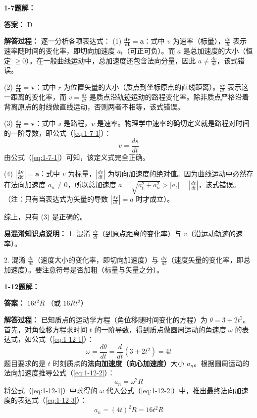\textbf{1-7题解：}
\setcounter{equation}{0}
\renewcommand{\theHequation}{1-7.\arabic{equation}}

\textbf{答案：} D

\textbf{解答过程：}
逐一分析各项表达式：
(1) $\mathbf{\frac{dv}{dt} = a}$：式中 $v$ 为速率（标量），$\frac{dv}{dt}$ 表示速率随时间的变化率，即切向加速度 $a_t$（可正可负）。而 $a$ 是总加速度的大小（恒定 $\ge 0$）。在一般曲线运动中，总加速度还包含法向分量，因此 $a \neq \frac{dv}{dt}$，该式错误。

(2) $\mathbf{\frac{dr}{dt} = v}$：式中 $r$ 为位置矢量的大小（质点到坐标原点的直线距离）。$\frac{dr}{dt}$ 表示这一距离的变化率，而 $v = \frac{ds}{dt}$ 是质点沿轨迹运动的路程变化率。除非质点严格沿着背离原点的射线做直线运动，否则两者不相等，该式错误。

(3) $\mathbf{\frac{ds}{dt} = v}$：式中 $s$ 是路程，$v$ 是速率。物理学中速率的确切定义就是路程对时间的一阶导数，即公式（\ref{eq:1-7-1}）：
\begin{equation}\label{eq:1-7-1}
	v = \frac{ds}{dt}
\end{equation}
由公式（\ref{eq:1-7-1}）可知，该定义式完全正确。

(4) $\mathbf{\left| \frac{dv}{dt} \right| = a}$：式中 $v$ 为标量，$\left| \frac{dv}{dt} \right|$ 为切向加速度的绝对值。因为曲线运动中必然存在法向加速度 $a_n \neq 0$，所以总加速度 $a = \sqrt{a_t^2 + a_n^2} > |a_t| = \left| \frac{dv}{dt} \right|$，该式错误。（注：只有当表达式为矢量的导数 $\left| \frac{d\mathbf{v}}{dt} \right| = a$ 时才成立）。

综上，只有 (3) 是正确的。

\textbf{易混淆知识点说明：}
1. 混淆 $\frac{dr}{dt}$（到原点距离的变化率）与 $v$（沿运动轨迹的速率）。

2. 混淆 $\frac{dv}{dt}$（速度大小的变化率，即切向加速度）与 $\frac{d\mathbf{v}}{dt}$（速度矢量的变化率，即总加速度）。要注意符号是否加粗（标量与矢量之分）。

\vspace{2em}

\textbf{1-12题解：}
\setcounter{equation}{0}
\renewcommand{\theHequation}{1-12.\arabic{equation}}

\textbf{答案：} $16t^2 R$ （或 $16Rt^2$）

\textbf{解答过程：}
已知质点的运动学方程（角位移随时间变化的方程）为 $\theta = 3 + 2t^2$。
首先，对角位移方程求时间 $t$ 的一阶导数，得到质点做圆周运动的角速度 $\omega$ 的表达式，如公式（\ref{eq:1-12-1}）：
\begin{equation}\label{eq:1-12-1}
	\omega = \frac{d\theta}{dt} = \frac{d}{dt}(3 + 2t^2) = 4t
\end{equation}
题目要求的是 $t$ 时刻质点的\textbf{法向加速度（向心加速度）}大小 $a_n$。根据圆周运动的法向加速度推导公式（\ref{eq:1-12-2}）：
\begin{equation}\label{eq:1-12-2}
	a_n = \omega^2 R
\end{equation}
将公式（\ref{eq:1-12-1}）中求得的 $\omega$ 代入公式（\ref{eq:1-12-2}）中，推出最终法向加速度的表达式（\ref{eq:1-12-3}）：
\begin{equation}\label{eq:1-12-3}
	a_n = (4t)^2 R = 16t^2 R
\end{equation}

